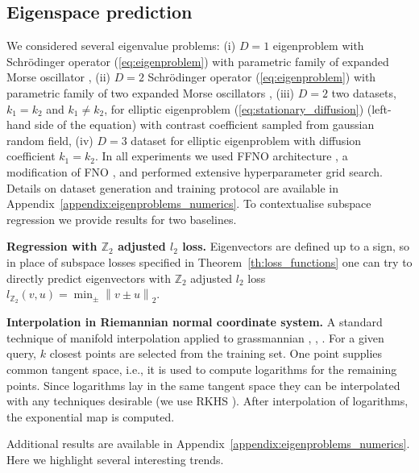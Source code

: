 \documentclass{article}
\begin{document}
\subsection{Eigenspace prediction}
We considered several eigenvalue problems: (i) $D=1$ eigenproblem with Schr\"{o}dinger operator (\ref{eq:eigenproblem}) with parametric family of expanded Morse oscillator \cite{le2006accurate}, (ii) $D=2$ Schr\"{o}dinger operator (\ref{eq:eigenproblem}) with parametric family of two expanded Morse oscillators \cite{carpenter2018dynamics}, (iii) $D=2$ two datasets, $k_1 = k_2$ and $k_1\neq k_2$, for elliptic eigenproblem (\ref{eq:stationary_diffusion}) (left-hand side of the equation) with contrast coefficient sampled from gaussian random field, (iv) $D=3$ dataset for elliptic eigenproblem with diffusion coefficient $k_1 = k_2$.
In all experiments we used FFNO architecture \cite{tran2021factorized} , a modification of FNO \cite{li2020fourier}, and performed extensive hyperparameter grid search. Details on dataset generation and training protocol are available in Appendix~\ref{appendix:eigenproblems_numerics}. To contextualise subspace regression we provide results for two baselines.

\textbf{Regression with $\mathbb{Z}_2$ adjusted $l_2$ loss.} Eigenvectors are defined up to a sign, so in place of subspace losses specified in Theorem~\ref{th:loss_functions} one can try to directly predict eigenvectors with $\mathbb{Z}_2$ adjusted $l_2$ loss $l_{\mathbb{Z}_2}(v, u) = \min_{\pm}\left\|v \pm u\right\|_2$.

\textbf{Interpolation in Riemannian normal coordinate system.} A standard technique of manifold interpolation applied to grassmannian \cite{amsallem2010interpolation}, \cite{ciaramella2025gentle}, \cite{zimmermann2019manifold}. For a given query, $k$ closest points are selected from the training set. One point supplies common tangent space, i.e., it is used to compute logarithms for the remaining points. Since logarithms lay in the same tangent space they can be interpolated with any techniques desirable (we use RKHS \cite{bishop2006pattern}). After interpolation of logarithms, the exponential map is computed.

Additional results are available in Appendix~\ref{appendix:eigenproblems_numerics}. Here we highlight several interesting trends.
\end{document}
